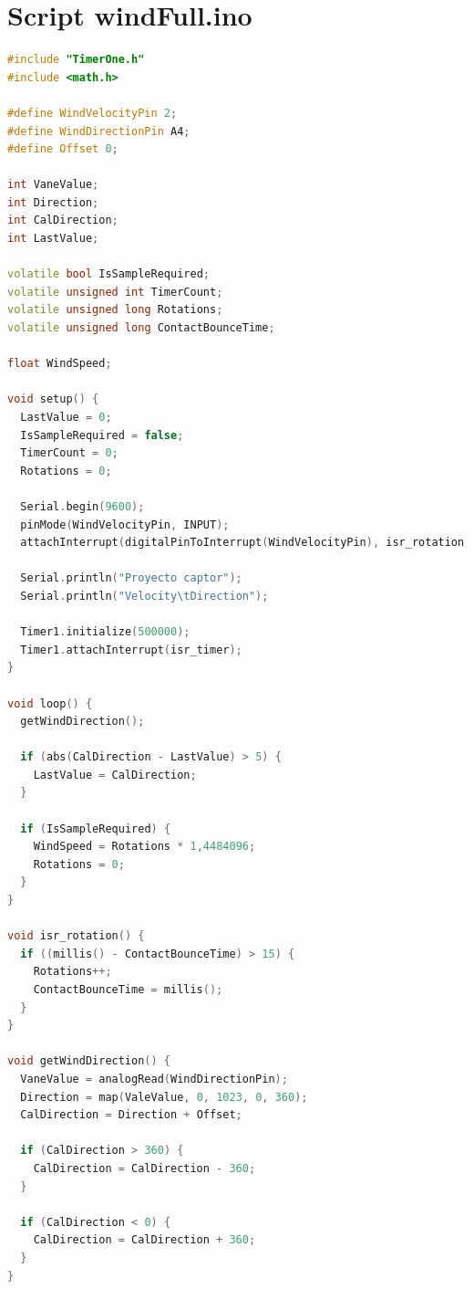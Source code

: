 \documentclass[a4paper, 11pt]{article}
\begin{document}
\section{Script windFull.ino}
\begin{lstlisting}[language = C++]
#include "TimerOne.h"
#include <math.h>

#define WindVelocityPin 2;
#define WindDirectionPin A4;
#define Offset 0;

int VaneValue;
int Direction;
int CalDirection;
int LastValue;

volatile bool IsSampleRequired;
volatile unsigned int TimerCount;
volatile unsigned long Rotations;
volatile unsigned long ContactBounceTime;

float WindSpeed;

void setup() {
  LastValue = 0;
  IsSampleRequired = false;
  TimerCount = 0;
  Rotations = 0;

  Serial.begin(9600);
  pinMode(WindVelocityPin, INPUT);
  attachInterrupt(digitalPinToInterrupt(WindVelocityPin), isr_rotation, FALLING);

  Serial.println("Proyecto captor");
  Serial.println("Velocity\tDirection");

  Timer1.initialize(500000);
  Timer1.attachInterrupt(isr_timer);
}

void loop() {
  getWindDirection();

  if (abs(CalDirection - LastValue) > 5) {
    LastValue = CalDirection;
  }

  if (IsSampleRequired) {
    WindSpeed = Rotations * 1,4484096;
    Rotations = 0;
  }
}

void isr_rotation() {
  if ((millis() - ContactBounceTime) > 15) {
    Rotations++;
    ContactBounceTime = millis();
  }
}

void getWindDirection() {
  VaneValue = analogRead(WindDirectionPin);
  Direction = map(ValeValue, 0, 1023, 0, 360);
  CalDirection = Direction + Offset;

  if (CalDirection > 360) {
    CalDirection = CalDirection - 360;
  }

  if (CalDirection < 0) {
    CalDirection = CalDirection + 360;
  }
}
\end{lstlisting}
\end{document}
